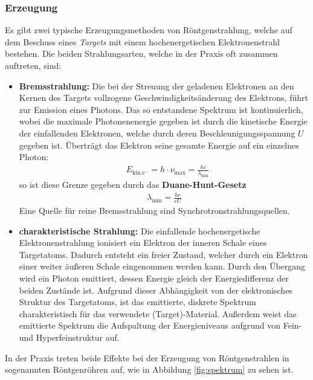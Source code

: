 \documentclass[11pt, a4paper]{article}
\numberwithin{equation}{section}
\begin{document}
\subsubsection{Erzeugung}
\label{sec:röntgenerzeugung}
Es gibt zwei typische Erzeugungsmethoden von Röntgenstrahlung, welche auf dem Beschuss eines \emph{Targets} mit einem hochenergetischen Elektronenstrahl bestehen.
Die beiden Strahlungsarten, welche in der Praxis oft zusammen auftreten, sind:
\begin{itemize}
	\item \textbf{Bremsstrahlung:} Die bei der Streuung der geladenen Elektronen an den Kernen des Targets vollzogene Geschwindigkeitsänderung des Elektrons, führt zur Emission eines Photons.
	Das so entstandene Spektrum ist kontinuierlich, wobei die maximale Photonenenergie gegeben ist durch die kinetische Energie der einfallenden Elektronen, welche durch deren Beschleunigungsspannung $U$ gegeben ist.
	Überträgt das Elektron seine gesamte Energie auf ein einzelnes Photon:
	\begin{align}
	&E_\mathrm{kin. e^-} = h \cdot \nu_\mathrm{max} = \frac{hc}{\lambda_\mathrm{min}}
	\end{align}
	so ist diese Grenze gegeben durch das \textbf{Duane-Hunt-Gesetz}
	\begin{align}
	\lambda_\mathrm{min} = \frac{h c}{e U}
	\label{eq:duane_hunt}
	\end{align}
	Eine Quelle für reine Bremsstrahlung sind Synchrotronstrahlungsquellen.
	
	\item \textbf{charakteristische Strahlung:} Die einfallende hochenergetische Elektronenstrahlung ionisiert ein Elektron der inneren Schale eines Targetatoms.
	Dadurch entsteht ein freier Zustand, welcher durch ein Elektron einer weiter äußeren Schale eingenommen werden kann.
	Durch den Übergang wird ein Photon emittiert, dessen Energie gleich der Energiedifferenz der beiden Zustände ist.
	Aufgrund dieser Abhängigkeit von der elektronisches Struktur des Targetatoms, ist das emittierte, diskrete Spektrum charakteristisch für das verwendete (Target)-Material.
	Außerdem weist das emittierte Spektrum die Aufspaltung der Energieniveaus aufgrund von Fein- und Hyperfeinstruktur auf.
\end{itemize}
In der Praxis treten beide Effekte bei der Erzeugung von Röntgenstrahlen in sogenannten Röntgenröhren auf, wie in Abbildung \ref{fig:spektrum} zu sehen ist.
\end{document}
